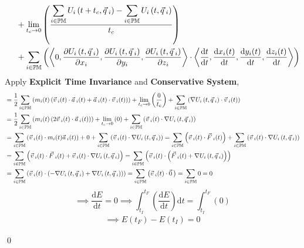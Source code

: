 \documentclass[12pt]{amsart}
\renewenvironment{proof}{{\bfseries Proof.}}{\qed}
\let\oldvec\vec
\renewcommand{\vec}[1]{\oldvec{#1}\hspace{0.1em}}
\begin{document}
\begin{proof}
\begin{align*}
& \quad \ + \lim_{t_c \to 0} \left ( \dfrac{ \displaystyle \sum_{i \in \mathbb{PM}}  U_i \left ( t+t_c, \vec{q}_i \right ) - \displaystyle \sum_{i \in \mathbb{PM}}  U_i \left ( t, \vec{q}_i \right ) }{t_c} \right ) \\
& \quad \ +  \displaystyle \sum_{i \in \mathbb{PM}} \left ( \left < 0, \dfrac{\partial  U_i \left ( t, \vec{q}_i \right )}{\partial x_i},\dfrac{\partial  U_i \left ( t, \vec{q}_i \right )}{\partial y_i}, \dfrac{\partial  U_i \left ( t, \vec{q}_i \right )}{\partial z_i} \right > \cdot \left < \dfrac{\mathrm{d} t}{\mathrm{d} t}, \dfrac{\mathrm{d} x_i(t)}{\mathrm{d} t}, \dfrac{\mathrm{d} y_i(t)}{\mathrm{d} t}, \dfrac{\mathrm{d} z_i(t)}{\mathrm{d} t}\right > \right )
\end{align*}
Apply \textbf{Explicit Time Invariance} and \textbf{Conservative System},
\begin{align*}
&= \dfrac{1}{2}\displaystyle\sum_{i \in \mathbb{PM}}\left( m_i (t) \left ( \vec{v}_i (t) \cdot \vec{a}_i (t) + \vec{a}_i (t) \cdot \vec{v}_i (t)\right) \right ) + \lim_{t_c \to 0} \left ( \dfrac{ 0 }{t_c} \right ) +  \displaystyle \sum_{i \in \mathbb{PM}} \left ( \nabla U_i \left ( t, \vec{q}_i \right )  \cdot \vec{v}_i (t) \right ) \\
&= \dfrac{1}{2}\displaystyle\sum_{i \in \mathbb{PM}}\left( m_i (t) \left ( 2 \vec{v}_i (t) \cdot \vec{a}_i (t)\right) \right ) + \lim_{t_c \to 0} \left (0 \right ) +  \displaystyle \sum_{i \in \mathbb{PM}} \left ( \vec{v}_i (t) \cdot \nabla U_i \left ( t, \vec{q}_i \right )  \right ) \\
&= \displaystyle\sum_{i \in \mathbb{PM}}\left( \vec{v}_i (t) \cdot m_i (t) \vec{a}_i (t) \right) + 0+\displaystyle \sum_{i \in \mathbb{PM}} \left ( \vec{v}_i (t) \cdot \nabla U_i \left ( t, \vec{q}_i \right )  \right ) = \displaystyle\sum_{i \in \mathbb{PM}}\left( \vec{v}_i (t) \cdot \vec{F}_i (t) \right) + \displaystyle \sum_{i \in \mathbb{PM}} \left ( \vec{v}_i (t) \cdot \nabla U_i \left ( t, \vec{q}_i \right )  \right ) \\ 
&= \displaystyle\sum_{i \in \mathbb{PM}}\left( \vec{v}_i (t) \cdot \vec{F}_i (t) + \vec{v}_i (t) \cdot \nabla U_i \left ( t, \vec{q}_i \right )  \right) = \displaystyle\sum_{i \in \mathbb{PM}}\left( \vec{v}_i (t) \cdot \left ( \vec{F}_i (t) + \nabla U_i \left ( t, \vec{q}_i \right )  \right ) \right) \\
&= \displaystyle\sum_{i \in \mathbb{PM}}\left( \vec{v}_i (t) \cdot \left (- \nabla U_i \left ( t, \vec{q}_i \right )  + \nabla U_i \left ( t, \vec{q}_i \right )  \right ) \right) = \displaystyle\sum_{i \in \mathbb{PM}}\left( \vec{v}_i (t) \cdot \vec{0} \right) = \displaystyle\sum_{i \in \mathbb{PM}} 0 = 0\\
\end{align*}
$$\implies \dfrac{\mathrm{d} E}{\mathrm{d} t} = 0 \implies \int^{t_F}_{t_I} \left( \dfrac{\mathrm{d} E}{\mathrm{d} t} \right ) \mathrm{d} t = \int^{t_F}_{t_I} \left( 0 \right ) $$
\begin{align*}\implies  E(t_F) -  E(t_I) = 0 \end{align*}

\end{proof}
\end{document}
